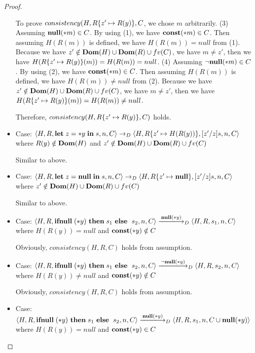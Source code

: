 \begin{proof}
\begin{itemize}
  To prove \(consistency(H, R\{z'\mapsto R(y)\}, C \), we chose
  \(m\) arbitrarily. (3) Assuming \(\mathbf{null}(*m) \in C\). By using (1),
  we have \(\mathbf{const}(*m) \in C\). Then assuming \(H(R(m))\) is defined,
  we have \(H(R(m)) = null\) from (1). Because we have \(z' \notin
  \mathbf{Dom}(H)\cup\mathbf{Dom}(R)\cup fv(C) \), we have \(m \ne z'\), then we have
  \( H(R\{z' \mapsto R(y)\}(m)) = H(R(m)) = null\). (4) Assuming
  \(\neg\mathbf{null}(*m) \in C\). By using (2), we have \(\mathbf{const}(*m) \in C\). Then
  assuming \(H(R(m))\) is defined, we have \(H(R(m)) \ne null\) from
  (2). Because we have \(z' \notin \mathbf{Dom}(H)\cup\mathbf{Dom}(R)\cup fv(C) \), we
  have \(m \ne z'\), then we have \( H(R\{z' \mapsto R(y)\}(m)) =
  H(R(m)) \ne null\).
  
  Therefore, \(consistency(H, R\{z' \mapsto R(y)\}, C)\) holds.

\item Case: \(\langle H, R, \mathbf{let}\; z = *y \; \mathbf{in}\; s, n, C
  \rangle \rightarrow_D \langle H, R\{z' \mapsto H(R(y))\}, [z'/z]s, n, C
  \rangle \) where \(R(y) \notin \mathbf{Dom}(H)\) and \(z' \notin \mathbf{Dom}(H)\cup\mathbf{Dom}(R)\cup fv(C) \)

  Similar to above.

\item Case: \(\langle H, R, \mathbf{let}\; z = \mathbf{null} \; \mathbf{in}\; s, n, C
  \rangle \rightarrow _D \langle H, R\{z' \mapsto \mathbf{null}\}, [z'/z]s, n, C
  \rangle \) where \(z' \notin \mathbf{Dom}(H)\cup\mathbf{Dom}(R)\cup fv(C) \)

  Similar to above.

\item Case: \(\langle H, R, \IFNULL(*y) \ \THEN s_1\ \ELSE\ s_2, n, C
  \rangle \xlongrightarrow{\NULL(*y)}_D \langle H, R, s_1, n, C \rangle \)
  where \( H(R(y)) = null \) and \(\mathbf{const}(*y) \notin C\)

  Obviously, \(consistency(H, R, C) \) holds from assumption.

\item Case: \(\langle H, R, \IFNULL(*y) \ \THEN s_1\ \ELSE\ s_2, n, C
  \rangle \xlongrightarrow{\neg\NULL(*y)}_D \langle H, R, s_2, n, C \rangle \)
  where \( H(R(y)) \ne null \) and \(\mathbf{const}(*y) \notin C\)

 Obviously, \(consistency(H, R, C) \) holds from assumption.

\item Case: \(\langle H, R, \IFNULL(*y) \ \THEN s_1\ \ELSE\ s_2, n, C
  \rangle \xlongrightarrow{\NULL(*y)}_D \langle H, R, s_1, n, C \cup{\NULL(*y)}
  \rangle \) where \( H(R(y)) =  null \) and \(\mathbf{const}(*y) \in C\)
  

\end{itemize}
\end{proof}

